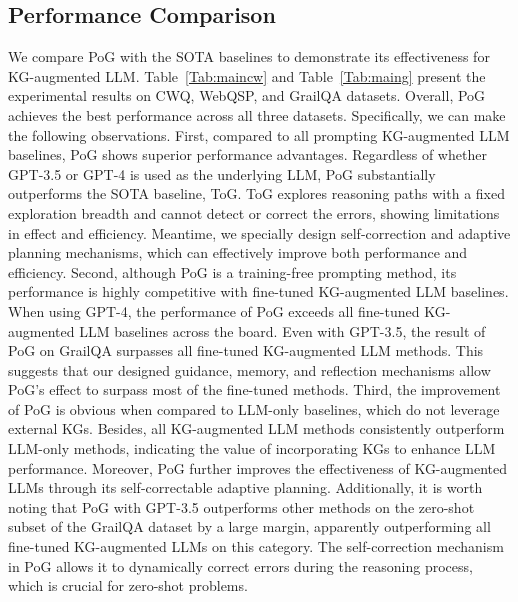\documentclass{article}
\begin{document}
\subsection{Performance Comparison}
\vspace{-2mm}
We compare PoG with the SOTA baselines to demonstrate its effectiveness for KG-augmented LLM.
Table~\ref{Tab:maincw} and Table~\ref{Tab:maing} present the experimental results on CWQ, WebQSP, and GrailQA datasets. 
Overall, PoG achieves the best performance across all three datasets.
Specifically, we can make the following observations.
First, compared to all prompting KG-augmented LLM baselines, PoG shows superior performance advantages. Regardless of whether GPT-3.5 or GPT-4 is used as the underlying LLM, PoG substantially outperforms the SOTA baseline, ToG.
ToG explores reasoning paths with a fixed exploration breadth and cannot detect or correct the errors, showing limitations in effect and efficiency. Meantime, we specially design self-correction and adaptive planning mechanisms, which can effectively improve both performance and efficiency.
Second, although PoG is a training-free prompting method, its performance is highly competitive with fine-tuned KG-augmented LLM baselines. When using GPT-4, the performance of PoG exceeds all fine-tuned KG-augmented LLM baselines across the board. Even with GPT-3.5,  the result of PoG on GrailQA surpasses all fine-tuned KG-augmented LLM methods.
This suggests that our designed guidance, memory, and reflection mechanisms allow PoG's effect to surpass most of the fine-tuned methods.
Third, the improvement of PoG is obvious when compared to LLM-only baselines, which do not leverage external KGs. Besides, all KG-augmented LLM methods consistently outperform LLM-only methods, indicating the value of incorporating KGs to enhance LLM performance. Moreover, PoG further improves the effectiveness of KG-augmented LLMs through its self-correctable adaptive planning.
Additionally, it is worth noting that PoG with GPT-3.5 outperforms other methods on the zero-shot subset of the GrailQA dataset by a large margin, apparently outperforming all fine-tuned KG-augmented LLMs on this category. The self-correction mechanism in PoG allows it to dynamically correct errors during the reasoning process, which is crucial for zero-shot problems.
\end{document}

